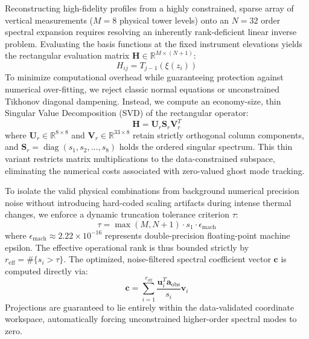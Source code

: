 \documentclass[11pt,a4paper]{article}
\begin{document}
Reconstructing high-fidelity profiles from a highly constrained, sparse array of vertical measurements ($M = 8$ physical tower levels) onto an $N=32$ order spectral expansion requires resolving an inherently rank-deficient linear inverse problem. Evaluating the basis functions at the fixed instrument elevations yields the rectangular evaluation matrix $\mathbf{H} \in \mathbb{R}^{M \times (N+1)}$:
\begin{equation}
H_{ij} = T_{j-1}(\xi(z_i))
\label{eq:h_matrix_def}
\end{equation}
To minimize computational overhead while guaranteeing protection against numerical over-fitting, we reject classic normal equations or unconstrained Tikhonov diagonal dampening. Instead, we compute an economy-size, thin Singular Value Decomposition (SVD) of the rectangular operator:
\begin{equation}
\mathbf{H} = \mathbf{U}_r \mathbf{S}_r \mathbf{V}_r^T
\label{eq:thin_svd}
\end{equation}
where $\mathbf{U}_r \in \mathbb{R}^{8 \times 8}$ and $\mathbf{V}_r \in \mathbb{R}^{33 \times 8}$ retain strictly orthogonal column components, and $\mathbf{S}_r = \operatorname{diag}(s_1, s_2, \ldots, s_8)$ holds the ordered singular spectrum. This thin variant restricts matrix multiplications to the data-constrained subspace, eliminating the numerical costs associated with zero-valued ghost mode tracking.

To isolate the valid physical combinations from background numerical precision noise without introducing hard-coded scaling artifacts during intense thermal changes, we enforce a dynamic truncation tolerance criterion $\tau$:
\begin{equation}
\tau = \max\left(M, N+1\right) \cdot s_1 \cdot \epsilon_{\mathrm{mach}}
\label{eq:dynamic_tolerance}
\end{equation}
where $\epsilon_{\mathrm{mach}} \approx 2.22 \times 10^{-16}$ represents double-precision floating-point machine epsilon. The effective operational rank is thus bounded strictly by $r_{\mathrm{eff}} = \#\{s_i > \tau\}$. The optimized, noise-filtered spectral coefficient vector $\mathbf{c}$ is computed directly via:
\begin{equation}
\mathbf{c} = \sum_{i=1}^{r_{\mathrm{eff}}} \frac{\mathbf{u}_i^T \mathbf{a}_{\mathrm{obs}}}{s_i} \mathbf{v}_i
\label{eq:svd_reconstruction}
\end{equation}
Projections are guaranteed to lie entirely within the data-validated coordinate workspace, automatically forcing unconstrained higher-order spectral modes to zero.
\end{document}
